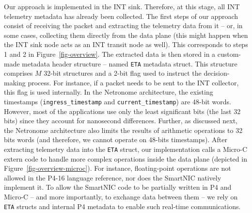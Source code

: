 Our approach is implemented in the INT sink. Therefore, at this stage, all INT telemetry metadata has already been collected. The first steps of our approach consist of receiving the packet and extracting the telemetry data from it -- or, in some cases, collecting them directly from the data plane (this might happen when the INT sink node acts as an INT transit node as well). This corresponds to steps 1 and 2 in Figure~\ref{fig-overview}. The extracted data is then stored in a custom-made metadata header structure -- named \texttt{ETA} metadata struct. This structure comprises $M$ 32-bit structures and a 2-bit flag used to instruct the decision-making process. For instance, if a packet needs to be sent to the INT collector, this flag is used internally. In the Netronome architecture, the existing timestamps (\texttt{ingress\_timestamp} and \texttt{current\_timestamp}) are 48-bit words. However, most of the applications use only the least significant bits (the last 32 bits) since they account for nanosecond differences. Further, as discussed next, the Netronome architecture also limits the results of arithmetic operations to 32 bits words (and therefore, we cannot operate on 48-bits timestamps). After extracting telemetry data into the \texttt{ETA} struct, our implementation calls a Micro-C extern code to handle more complex operations inside the data plane (depicted in Figure~\ref{fig-overview-microc}). For instance, floating-point operations are not allowed in the P4-16 language reference, nor does the SmartNIC natively implement it. To allow the SmartNIC code to be partially written in P4 and Micro-C -- and more importantly, to exchange data between them -- we rely on \texttt{ETA} structs and internal P4 metadata to enable such real-time communications.

